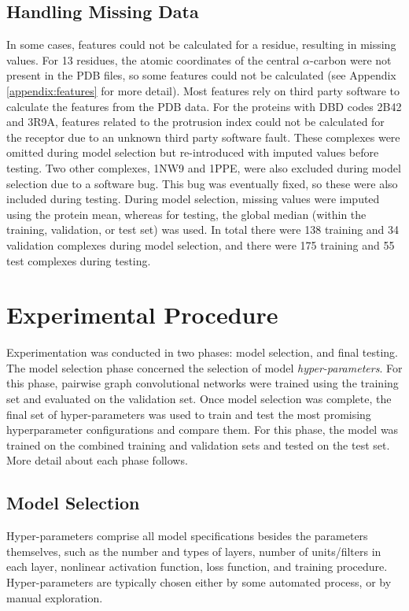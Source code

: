\subsection{Handling Missing Data}
\label{sect:missing_data}

In some cases, features could not be calculated for a residue, resulting in missing values.
For 13 residues, the atomic coordinates of the central $\alpha$-carbon were not present in the PDB files, so some features could not be calculated (see Appendix \ref{appendix:features} for more detail).
Most features rely on third party software to calculate the features from the PDB data.
For the proteins with DBD codes 2B42 and 3R9A, features related to the protrusion index could not be calculated for the receptor due to an unknown third party software fault.
These complexes were omitted during model selection but re-introduced with imputed values before testing.
Two other complexes, 1NW9 and 1PPE, were also excluded during model selection due to a software bug.
This bug was eventually fixed, so these were also included during testing. 
During model selection, missing values were imputed using the protein mean, whereas for testing, the global median (within the training, validation, or test set) was used.
In total there were 138 training and 34 validation complexes during model selection, and there were 175 training and 55 test complexes during testing.

\section{Experimental Procedure}

Experimentation was conducted in two phases: model selection, and final testing.
The model selection phase concerned the selection of model \emph{hyper-parameters}.
For this phase, pairwise graph convolutional networks were trained using the training set and evaluated on the validation set.
Once model selection was complete, the final set of hyper-parameters was used to train and test the most promising hyperparameter configurations and compare them.
For this phase, the model was trained on the combined training and validation sets and tested on the test set.
More detail about each phase follows.


\subsection{Model Selection}

Hyper-parameters comprise all model specifications besides the parameters themselves, such as the number and types of layers, number of units/filters in each layer, nonlinear activation function, loss function, and training procedure.
Hyper-parameters are typically chosen either by some automated process, or by manual exploration.

